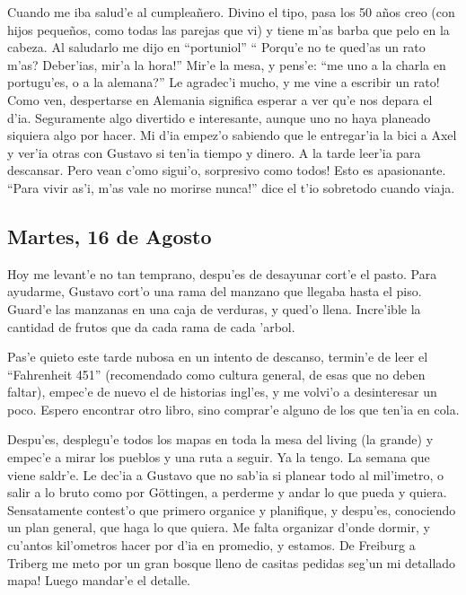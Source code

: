 Cuando me iba salud'e al cumplea\~nero. Divino el tipo, pasa los 50 a\~nos creo
(con hijos peque\~nos, como todas las parejas que vi) y tiene m'as barba que
pelo en la cabeza. Al saludarlo me dijo en ``portuniol'' ``\textquestiondown
Porqu'e no te qued'as un rato m'as? Deber'ias, \textexclamdown mir'a la hora!''
Mir'e la mesa, y pens'e: ``\textquestiondown me uno a la charla en portugu'es, o
a la alemana?'' Le agradec'i mucho, \textexclamdown y me vine a escribir un
rato!\\

Como ven, despertarse en Alemania significa esperar a ver qu'e nos depara el
d'ia. Seguramente algo divertido e interesante, aunque uno no haya planeado
siquiera algo por hacer. Mi d'ia empez'o sabiendo que le entregar'ia la bici a
Axel y ver'ia otras con Gustavo si ten'ia tiempo y dinero. A la tarde leer'ia
para descansar. Pero vean c'omo sigui'o, \textexclamdown sorpresivo como todos!
Esto es apasionante. ``\textexclamdown Para vivir as'i, m'as vale no morirse
nunca!'' dice el t'io sobretodo cuando viaja.

\subsection*{Martes, 16 de Agosto}

Hoy me levant'e no tan temprano, despu'es de desayunar cort'e el pasto. Para
ayudarme, Gustavo cort'o una rama del manzano que llegaba hasta el piso. Guard'e
las manzanas en una caja de verduras, y qued'o llena. Incre'ible la cantidad de
frutos que da cada rama de cada 'arbol.

Pas'e quieto este tarde nubosa en un intento de descanso, termin'e de leer el
``Fahrenheit 451'' (recomendado como cultura general, de esas que no deben
faltar), empec'e de nuevo el de historias ingl'es, y me volvi'o a desinteresar
un poco. Espero encontrar otro libro, sino comprar'e alguno de los que ten'ia en
cola.

Despu'es, desplegu'e todos los mapas en toda la mesa del living (la grande) y
empec'e a mirar los pueblos y una ruta a seguir. Ya la tengo. La semana que
viene saldr'e. Le dec'ia a Gustavo que no sab'ia si planear todo al mil'imetro,
o salir a lo bruto como por G\"ottingen, a perderme y andar lo que pueda y
quiera. Sensatamente contest'o que primero organice y planifique, y despu'es,
conociendo un plan general, que haga lo que quiera. Me falta organizar d'onde
dormir, y cu'antos kil'ometros hacer por d'ia en promedio, y estamos.
\textexclamdown De Freiburg a Triberg me meto por un gran bosque lleno de
casitas pedidas seg'un mi detallado mapa! Luego mandar'e el detalle.

